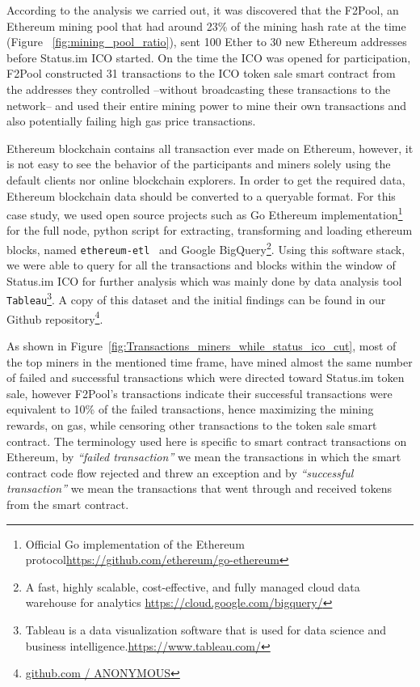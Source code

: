 According to the analysis we carried out, it was discovered that the F2Pool, an Ethereum mining pool that had around 23\% of the mining hash rate at the time (Figure ~\ref{fig:mining_pool_ratio}), sent 100 Ether to 30 new Ethereum addresses before Status.im ICO started. On the time the ICO was opened for participation, F2Pool constructed 31 transactions to the ICO token sale smart contract from the addresses they controlled --without broadcasting these transactions to the network-- and used their entire mining power to mine their own transactions and also potentially failing high gas price transactions.

Ethereum blockchain contains all transaction ever made on Ethereum, however, it is not easy to see the behavior of the participants and miners solely using the default clients nor online blockchain explorers. In order to get the required data, Ethereum blockchain data should be converted to a queryable format. For this case study, we used open source projects such as Go Ethereum implementation\footnote{Official Go implementation of the Ethereum protocol\url{https://github.com/ethereum/go-ethereum}} for the full node, python script for extracting, transforming and loading ethereum blocks, named \texttt{ethereum-etl}~\cite{ethereumetl} and Google BigQuery\footnote{A fast, highly scalable, cost-effective, and fully managed cloud data warehouse for analytics \url{https://cloud.google.com/bigquery/}}. Using this software stack, we were able to query for all the transactions and blocks within the window of Status.im ICO for further analysis which was mainly done by data analysis tool \texttt{Tableau}\footnote{Tableau is a data visualization software that is used for data science and business intelligence.\url{https://www.tableau.com/}}. A copy of this dataset and the initial findings can be found in our Github repository\footnote{\url{github.com / ANONYMOUS}}. 


As shown in Figure~\ref{fig:Transactions_miners_while_status_ico_cut}, most of the top miners in the mentioned time frame, have mined almost the same number of failed and successful transactions which were directed toward Status.im token sale, however F2Pool's transactions indicate their successful transactions were equivalent to 10\% of the failed transactions, hence maximizing the mining rewards, on gas, while censoring other transactions to the token sale smart contract. The terminology used here is specific to smart contract transactions on Ethereum, by \textit{``failed transaction''} we mean the transactions in which the smart contract code flow rejected and threw an exception and by \textit{``successful transaction''} we mean the transactions that went through and received tokens from the smart contract. 


